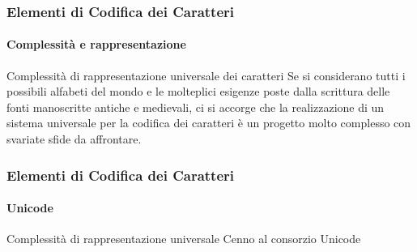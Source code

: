 \begin{frame}
	\frametitle{Elementi di Codifica dei Caratteri}
	\framesubtitle{Complessità e rappresentazione}
	\addtocounter{nframe}{1}

	\begin{block}{Complessità di rappresentazione universale dei caratteri}
		Se si considerano tutti i possibili alfabeti del mondo e le molteplici esigenze poste dalla scrittura delle fonti manoscritte antiche e medievali, ci si accorge che la realizzazione di un sistema universale per la codifica dei caratteri è un progetto molto complesso con svariate sfide da affrontare.
	\end{block}

\end{frame}


\begin{frame}
	\frametitle{Elementi di Codifica dei Caratteri}
	\framesubtitle{Unicode}
	\addtocounter{nframe}{1}

	\begin{block}{Complessità di rappresentazione universale}
		Cenno al consorzio Unicode
	\end{block}

\end{frame}

